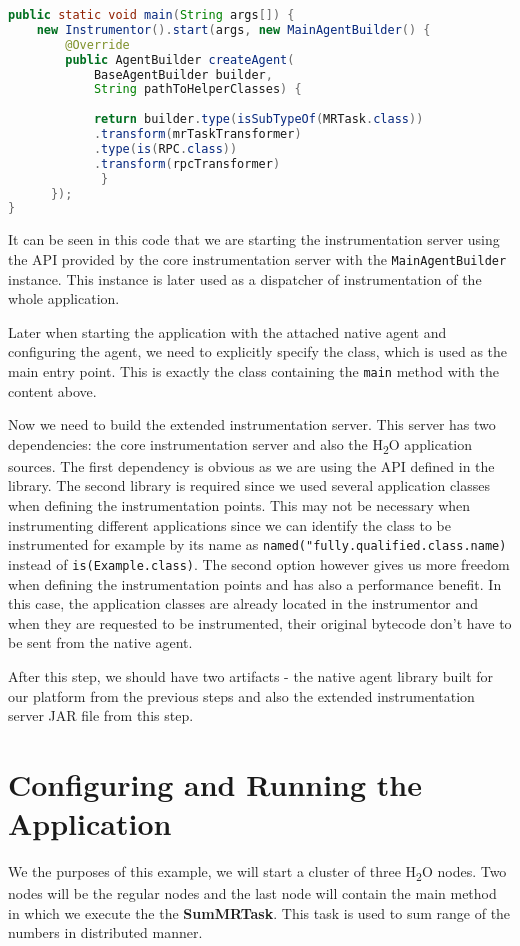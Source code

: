 \begin{lstlisting}[language=Java]
 public static void main(String args[]) {
	new Instrumentor().start(args, new MainAgentBuilder() {
		@Override
		public AgentBuilder createAgent(
			BaseAgentBuilder builder,
			String pathToHelperClasses) {
	 		 
			return builder.type(isSubTypeOf(MRTask.class))
			.transform(mrTaskTransformer)
			.type(is(RPC.class))
			.transform(rpcTransformer)
	         }
	  });
}			 
\end{lstlisting}
It can be seen in this code that we are starting the instrumentation server using the API provided by the core instrumentation server with the \texttt{MainAgentBuilder} instance. This instance is later used as a dispatcher of instrumentation of the whole application.

Later when starting the application with the attached native agent and configuring the agent, we need to explicitly specify the class, which is used as the main entry point. This is exactly the class containing the \texttt{main} method with the content above.

Now we need to build the extended instrumentation server. This server has two dependencies: the core instrumentation server and also the H\textsubscript{2}O application sources. The first dependency is obvious as we are using the API defined in the library. The second library is required since we used several application classes when defining the instrumentation points. This may not be necessary when instrumenting different applications since we can identify the class to be instrumented for example by its name as \texttt{named("fully.qualified.class.name)} instead of \texttt{is(Example.class)}. The second option however gives us more freedom when defining the instrumentation points and has also a performance benefit. In this case, the application classes are already located in the instrumentor and when they are requested to be instrumented, their original bytecode don't have to be sent from the native agent. 

After this step, we should have two artifacts - the native agent library built for our platform from the previous steps and also the extended instrumentation server JAR file from this step.
\section{Configuring and Running the Application}
We the purposes of this example, we will start a cluster of three H\textsubscript{2}O nodes. Two nodes will be the regular nodes and the last node will contain the main method in which we execute the the \textbf{SumMRTask}. This task is used to sum range of the numbers in distributed manner.

